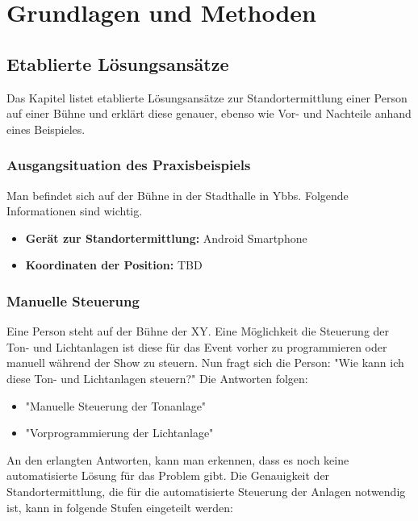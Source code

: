 
\pagestyle{fancy} \frenchspacing
\renewcommand{\chaptermark}[1]{\markboth{#1}{}}

\renewcommand{\textfraction}{0}
\renewcommand{\floatpagefraction}{0.999}
\renewcommand{\topfraction}{0.7}
\renewcommand{\bottomfraction}{0.999}
\lfoot{}

\chapter{Grundlagen und Methoden}

\section{Etablierte Lösungsansätze}
Das Kapitel listet etablierte Lösungsansätze zur Standortermittlung einer Person auf einer Bühne und erklärt diese genauer, ebenso wie Vor- und Nachteile anhand eines Beispieles.

\subsection{Ausgangsituation des Praxisbeispiels}

Man befindet sich auf der Bühne in der Stadthalle in Ybbs. Folgende Informationen sind wichtig.
\begin{itemize}
	\item \textbf{Gerät zur Standortermittlung: } Android Smartphone
	\item \textbf{Koordinaten der Position: } TBD  
\end{itemize}

\subsection{Manuelle Steuerung}
Eine Person steht auf der Bühne der XY. Eine Möglichkeit die Steuerung der Ton- und Lichtanlagen ist diese für das Event vorher zu programmieren oder manuell während der Show zu steuern. Nun fragt sich die Person: "Wie kann ich diese Ton- und Lichtanlagen steuern?" Die Antworten folgen:

\begin{itemize}
	\item "Manuelle Steuerung der Tonanlage"
	\item "Vorprogrammierung der Lichtanlage"
\end{itemize}

An den erlangten Antworten, kann man erkennen, dass es noch keine automatisierte Lösung für das Problem gibt. Die Genauigkeit der Standortermittlung, die für die automatisierte Steuerung der Anlagen notwendig ist, kann in folgende Stufen eingeteilt werden: 


